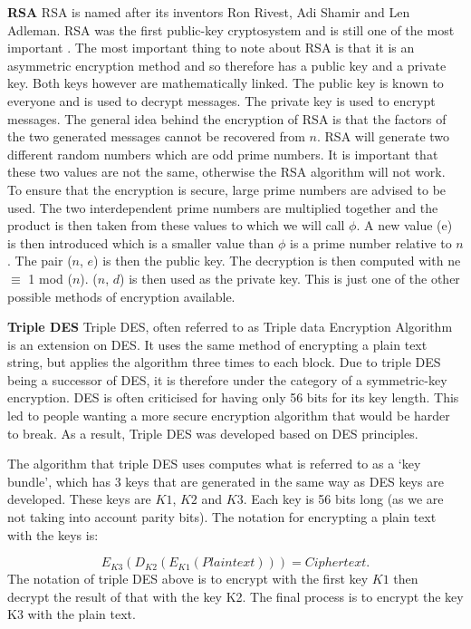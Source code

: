 \documentclass[11pt,a4paper, notitlepage]{report}
\begin{document}
\textbf{RSA}\newline
RSA is named after its inventors Ron Rivest, Adi Shamir and Len Adleman. RSA was the first public-key cryptosystem and is still one of the most important \cite{DBLP:series/isc/DelfsK07}. The most important thing to note about RSA is that it is an asymmetric encryption method and so therefore has a public key and a private key. Both keys however are mathematically linked. The public key is known to everyone and is used to decrypt messages. The private key is used to encrypt messages. The general idea behind the encryption of RSA is that the factors of the two generated messages cannot be recovered from $n$. RSA will generate two different random numbers which are odd prime numbers. It is important that these two values are not the same, otherwise the RSA algorithm will not work. To ensure that the encryption is secure, large prime numbers are advised to be used. The two interdependent prime numbers are multiplied together and the product is then taken from these values to which we will call $\phi$. A new value (e) is then introduced which is a smaller value than $\phi$ is a prime number relative to $n$. The pair ($n$, $e$) is then the public key. The decryption is then computed with ne $\equiv$ 1 mod ($n$). ($n$, $d$) is then used as the private key. This is just one of the other possible methods of encryption available.
\newline

\textbf{Triple DES}\newline
Triple DES, often referred to as Triple data Encryption Algorithm is an extension on DES. It uses the same method of encrypting a plain text string, but applies the algorithm three times to each block. Due to triple DES being a successor of DES, it is therefore under the category of a symmetric-key encryption. DES is often criticised for having only 56 bits for its key length. This led to people wanting a more secure encryption algorithm that would be harder to break. As a result, Triple DES was developed based on DES principles. 

The algorithm that triple DES uses computes what is referred to as a `key bundle', which has 3 keys that are generated in the same way as DES keys are developed. These keys are $K1$, $K2$ and $K3$. Each key is 56 bits long (as we are not taking into account parity bits). The notation for encrypting a plain text with the keys is:

\begin{displaymath}
E_{K3}(D_{K2}(E_{K1}(Plain text))) = Cipher text.
\end{displaymath} 
The notation of triple DES above is to encrypt with the first key $K1$ then decrypt the result of that with the key K2. The final process is to encrypt the key K3 with the plain text. 
\end{document}
